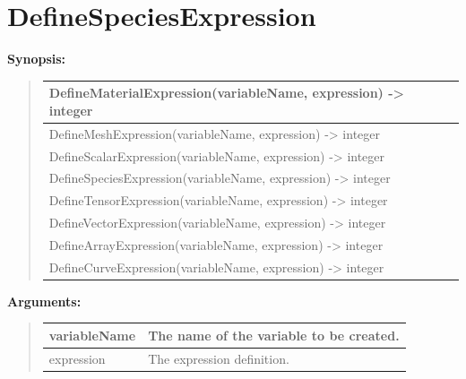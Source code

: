 \documentclass[letterpaper,10pt,english]{sphinxmanual}
\begin{document}
\section{DefineSpeciesExpression}
\label{functions:definespeciesexpression}
\begin{DUlineblock}{0em}
\item[] \textbf{Synopsis:}
\end{DUlineblock}
\begin{quote}

\begin{tabulary}{\linewidth}{|L|}
\hline

DefineMaterialExpression(variableName, expression) -\textgreater{} integer
\\
\hline
DefineMeshExpression(variableName, expression) -\textgreater{} integer
\\
\hline
DefineScalarExpression(variableName, expression) -\textgreater{} integer
\\
\hline
DefineSpeciesExpression(variableName, expression) -\textgreater{} integer
\\
\hline
DefineTensorExpression(variableName, expression) -\textgreater{} integer
\\
\hline
DefineVectorExpression(variableName, expression) -\textgreater{} integer
\\
\hline
DefineArrayExpression(variableName, expression) -\textgreater{} integer
\\
\hline
DefineCurveExpression(variableName, expression) -\textgreater{} integer
\\
\hline\end{tabulary}

\end{quote}

\begin{DUlineblock}{0em}
\item[] 
\item[] \textbf{Arguments:}
\end{DUlineblock}
\begin{quote}

\begin{tabulary}{\linewidth}{|L|L|}
\hline

variableName
 & 
The name of the variable to be created.
\\
\hline
expression
 & 
The expression definition.
\\
\hline\end{tabulary}

\end{quote}
\end{document}
